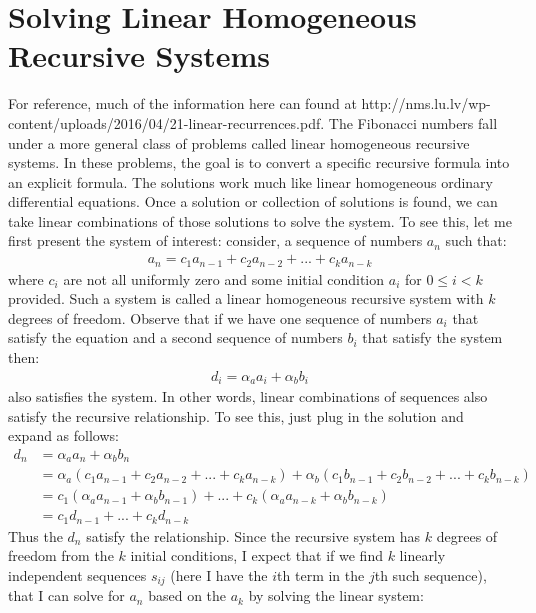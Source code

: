 \documentclass{article}
\begin{document}
\section*{Solving Linear Homogeneous Recursive Systems}
For reference, much of the information here can found at http://nms.lu.lv/wp-content/uploads/2016/04/21-linear-recurrences.pdf. The Fibonacci numbers fall under a more general class of problems called linear homogeneous recursive systems. In these problems, the goal is to convert a specific recursive formula into an explicit formula. The solutions work much like linear homogeneous ordinary differential equations. Once a solution or collection of solutions is found, we can take linear combinations of those solutions to solve the system. To see this, let me first present the system of interest: consider, a sequence of numbers $a_{n}$ such that:
\begin{gather*}
	a_{n} = c_{1}a_{n - 1} + c_{2}a_{n - 2} + ... + c_{k}a_{n - k}
\end{gather*}
where $c_{i}$ are not all uniformly zero and some initial condition $a_{i}$ for $0 \le i < k$ provided. Such a system is called a linear homogeneous recursive system with $k$ degrees of freedom. Observe that if we have one sequence of numbers $a_{i}$ that satisfy the equation and a second sequence of numbers $b_{i}$ that satisfy the system then:
\begin{gather*}
	d_{i} = \alpha_{a}a_{i} + \alpha_{b}b_{i}
\end{gather*}
also satisfies the system. In other words, linear combinations of sequences also satisfy the recursive relationship. To see this, just plug in the solution and expand as follows:
\begin{align*}
	d_{n} &= \alpha_{a}a_{n} + \alpha_{b}b_{n}\\
	&= \alpha_{a}\left(c_{1}a_{n - 1} + c_{2}a_{n - 2} + ... + c_{k}a_{n - k}\right) + \alpha_{b}\left(c_{1}b_{n - 1} + c_{2}b_{n - 2} + ... + c_{k}b_{n - k}\right)\\
	&= c_{1}\left(\alpha_{a}a_{n - 1} + \alpha_{b}b_{n - 1}\right) + ... + c_{k}\left(\alpha_{a}a_{n - k} + \alpha_{b}b_{n - k}\right)\\
	&= c_{1}d_{n - 1} + ... + c_{k}d_{n - k}
\end{align*}
Thus the $d_{n}$ satisfy the relationship. Since the recursive system has $k$ degrees of freedom from the $k$ initial conditions, I expect that if we find $k$ linearly independent sequences $s_{ij}$ (here I have the $i$th term in the $j$th such sequence), that I can solve for $a_{n}$ based on the $a_{k}$ by solving the linear system:
\end{document}
